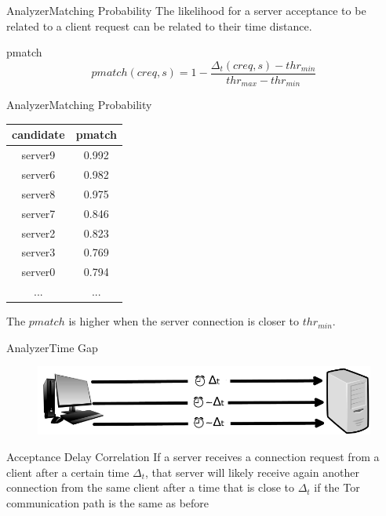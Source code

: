 	\begin{frame}{Analyzer}{Matching Probability}
	The likelihood for a server acceptance to be related to a client
request can be related to their time distance.
	\begin{block}{pmatch}
		\begin{equation}
		pmatch(creq, s) = 1 - \frac{\Delta_t(creq, s) - thr_{min}}{thr_{max} - thr_{min}}
		\end{equation}
	\end{block}
	\end{frame}

	\begin{frame}{Analyzer}{Matching Probability}
		\begin{center}
		\begin{minipage}{0.4\textwidth}
		\begin{tabular}{ | c | c |}
			\hline
			candidate &	pmatch\\
			\hline
			server9   &	0.992\\
			server6 &	0.982\\
			server8 &	0.975\\
			server7  &	0.846\\
			server2  &	0.823\\
			server3  &	0.769\\
			server0  &	0.794\\
			... & ... \\
			\hline

		\end{tabular}
		\end{minipage}
		\begin{minipage}{0.4\textwidth}
			The $pmatch$ is higher when the server connection is
closer to $thr_{min}$.
		\end{minipage}
		\end{center}		
	\end{frame}
	
	\begin{frame}{Analyzer}{Time Gap}
		\begin{figure}
			\centering
			\includegraphics[scale=0.35]{img/gap.png}
		\end{figure}

		\begin{block}{Acceptance Delay Correlation}
		If a server receives a
		connection request from a client after a certain time $\Delta_t$, that
		server will likely receive again another connection from the same client
		after a time that is close to $\Delta_t$ if the Tor communication path is the same as
		before
		\end{block}
	\end{frame}	
	
